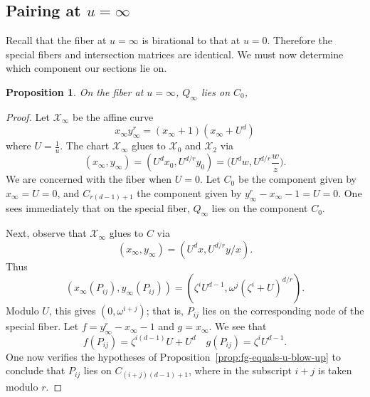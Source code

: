 \documentclass[pagesize,paper=letter]{scrartcl}
\newtheorem{proposition}[thm]{Proposition}
\theoremstyle{definition}
\theoremstyle{remark}
\def\sX{\mathcal{X}}
\newcommand{\sxi}{\mathcal{X}_\infty}
\begin{document}
\subsection{Pairing at $u=\infty$}
\label{sec:pairing-at-u=infty}

Recall that the fiber at $u=\infty$ is birational to that at $u=0$. Therefore the special fibers and intersection matrices are identical. We must now determine which component our sections lie on.
\begin{proposition}
  On the fiber at $u=\infty$, $Q_\infty$ lies on $C_0$, 
\end{proposition}

\begin{proof}
  Let $\sxi$ be the affine curve
  \[
  x_\infty y_\infty^r = (x_\infty + 1)(x_\infty + {U^d})
  \]
  where $U = \frac{1}{u}$. The chart $\sxi$ glues to $\sX_0$ and $\sX_2$ via 
  \[
  (x_\infty, y_\infty) = (U^d x_0, U^{d/r} y_0) = \bigg(U^d w, U^{d/r} \frac{w}{z}\bigg).
  \]
  We are concerned with the fiber when $U = 0$. Let $C_0$ be the component given by $x_\infty = U = 0$, and $C_{r(d-1)+1}$ the component given by $y_\infty^r - x_\infty - 1 = U = 0$. One sees immediately that on the special fiber, $Q_\infty$ lies on the component $C_0$.

  Next, observe that $\sxi$ glues to $C$ via
  \[
  (x_\infty, y_\infty) = (U^d x, U^{d/r} y/x).
  \]
  Thus
  \[
  (x_\infty(P_{ij}), y_\infty(P_{ij})) = (\zeta^i U^{d-1}, \omega^j (\zeta^i + U)^{d/r}).
  \]
  Modulo $U$, this gives $(0,\omega^{i+j})$; that is, $P_{ij}$ lies on the corresponding node of the special fiber. Let $f = y_\infty^r - x_\infty - 1$ and $g = x_\infty$. We see that 
  \[
  f(P_{ij}) = \zeta^{i(d-1)} U + U^d \quad g(P_{ij}) = \zeta^i U^{d-1}.
  \]
  One now verifies the hypotheses of Proposition~\ref{prop:fg-equals-u-blow-up} to conclude that $P_{ij}$ lies on $C_{(i+j)(d-1) +1}$, where in the subscript $i+j$ is taken modulo $r$.
\end{proof}
\end{document}
